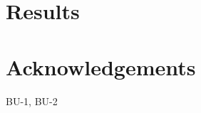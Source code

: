 \documentclass[11pt]{article}
\begin{document}


\section{Results}
\label{Sect:results}




\section{Acknowledgements}
\label{Sect:aknowledgement}


BU-1, BU-2



\end{document}
